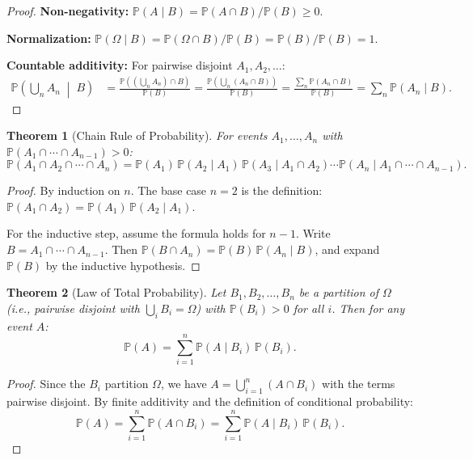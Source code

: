 \documentclass[11pt,a4paper]{article}
\theoremstyle{definition}
\theoremstyle{plain}
\newtheorem{theorem}{Theorem}[section]
\theoremstyle{remark}
\newcommand{\Prob}{\mathbb{P}}
\begin{document}
\begin{proof}
\textbf{Non-negativity:} $\Prob(A \mid B) = \Prob(A \cap B)/\Prob(B) \geq 0$.

\textbf{Normalization:} $\Prob(\Omega \mid B) = \Prob(\Omega \cap B)/\Prob(B) = \Prob(B)/\Prob(B) = 1$.

\textbf{Countable additivity:} For pairwise disjoint $A_1, A_2, \ldots$:
\begin{align}
    \Prob\!\left(\bigcup_n A_n \;\middle|\; B\right) &= \frac{\Prob\!\left(\left(\bigcup_n A_n\right) \cap B\right)}{\Prob(B)} = \frac{\Prob\!\left(\bigcup_n (A_n \cap B)\right)}{\Prob(B)} = \frac{\sum_n \Prob(A_n \cap B)}{\Prob(B)} = \sum_n \Prob(A_n \mid B).
\end{align}
\end{proof}

\begin{theorem}[Chain Rule of Probability]
\label{thm:chain_rule}
For events $A_1, \ldots, A_n$ with $\Prob(A_1 \cap \cdots \cap A_{n-1}) > 0$:
\begin{equation}
    \Prob(A_1 \cap A_2 \cap \cdots \cap A_n) = \Prob(A_1)\, \Prob(A_2 \mid A_1)\, \Prob(A_3 \mid A_1 \cap A_2) \cdots \Prob(A_n \mid A_1 \cap \cdots \cap A_{n-1}).
    \label{eq:chain_rule}
\end{equation}
\end{theorem}

\begin{proof}
By induction on $n$. The base case $n = 2$ is the definition: $\Prob(A_1 \cap A_2) = \Prob(A_1)\, \Prob(A_2 \mid A_1)$.

For the inductive step, assume the formula holds for $n-1$. Write $B = A_1 \cap \cdots \cap A_{n-1}$. Then $\Prob(B \cap A_n) = \Prob(B)\, \Prob(A_n \mid B)$, and expand $\Prob(B)$ by the inductive hypothesis.
\end{proof}

\begin{theorem}[Law of Total Probability]
\label{thm:total_prob}
Let $B_1, B_2, \ldots, B_n$ be a partition of $\Omega$ (i.e., pairwise disjoint with $\bigcup_i B_i = \Omega$) with $\Prob(B_i) > 0$ for all $i$. Then for any event $A$:
\begin{equation}
    \Prob(A) = \sum_{i=1}^n \Prob(A \mid B_i)\, \Prob(B_i).
    \label{eq:total_prob}
\end{equation}
\end{theorem}

\begin{proof}
Since the $B_i$ partition $\Omega$, we have $A = \bigcup_{i=1}^n (A \cap B_i)$ with the terms pairwise disjoint. By finite additivity and the definition of conditional probability:
\begin{equation}
    \Prob(A) = \sum_{i=1}^n \Prob(A \cap B_i) = \sum_{i=1}^n \Prob(A \mid B_i)\, \Prob(B_i).
\end{equation}
\end{proof}
\end{document}
